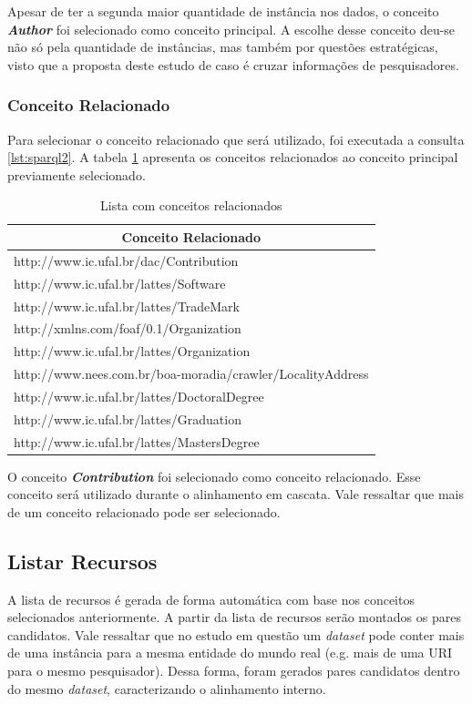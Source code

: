 Apesar de ter a segunda maior quantidade de instância nos dados, o conceito \textbf{\textit{Author}} foi selecionado como conceito principal. A escolhe desse conceito deu-se não só pela quantidade de instâncias, mas também por questões estratégicas, visto que a proposta deste estudo de caso é cruzar informações de pesquisadores.

\subsubsection{Conceito Relacionado}
Para selecionar o conceito relacionado que será utilizado, foi executada a consulta \ref{lst:sparql2}. A tabela \ref{tab:estudo_sparql2} apresenta os conceitos relacionados ao conceito principal previamente selecionado.

\begin{table}[h]
	\centering
	\caption{Lista com conceitos relacionados}
	\label{tab:estudo_sparql2}
	\begin{tabular}{@{}|l|@{}}
		\hline
		\multicolumn{1}{|c|}{\textbf{Conceito Relacionado}}        \\ \hline
		http://www.ic.ufal.br/dac/Contribution                     \\ \hline
		http://www.ic.ufal.br/lattes/Software                      \\ \hline
		http://www.ic.ufal.br/lattes/TradeMark                     \\ \hline
		http://xmlns.com/foaf/0.1/Organization                     \\ \hline
		http://www.ic.ufal.br/lattes/Organization                  \\ \hline
		http://www.nees.com.br/boa-moradia/crawler/LocalityAddress \\ \hline
		http://www.ic.ufal.br/lattes/DoctoralDegree                \\ \hline
		http://www.ic.ufal.br/lattes/Graduation                    \\ \hline
		http://www.ic.ufal.br/lattes/MastersDegree                 \\ \hline
	\end{tabular}
\end{table}
 
O conceito \textbf{\textit{Contribution}} foi selecionado como conceito relacionado. Esse conceito será utilizado durante o alinhamento em cascata. Vale ressaltar que mais de um conceito relacionado pode ser selecionado.
 
\subsection{Listar Recursos}
A lista de recursos é gerada de forma automática com base nos conceitos selecionados anteriormente. A partir da lista de recursos serão montados os pares candidatos. Vale ressaltar que no estudo em questão um \textit{dataset} pode conter mais de uma instância para a mesma entidade do mundo real (e.g. mais de uma URI para o mesmo pesquisador). Dessa forma, foram gerados pares candidatos dentro do mesmo \textit{dataset}, caracterizando o alinhamento interno.

